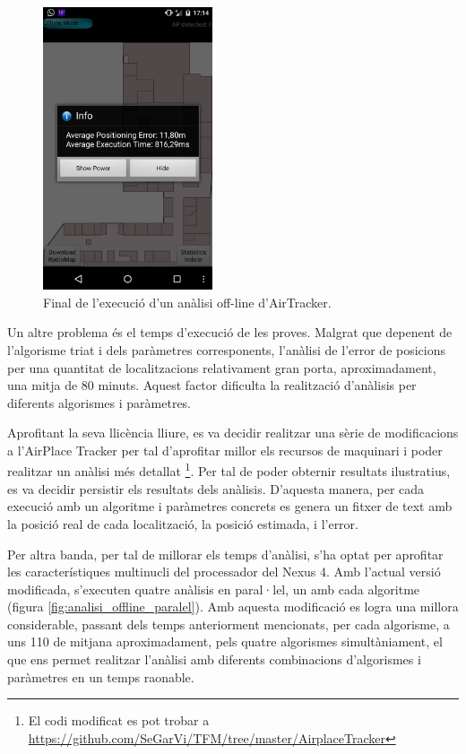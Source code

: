 \begin{figure}[ht]
\begin{center}
\includegraphics[width=5cm]{imatges/analisi_offline_defecte.png}
\caption{Final de l'execució d'un anàlisi off-line d'AirTracker.}
\label{fig:analisi_offline_defecte}
\end{center}
\end{figure}

Un altre problema és el temps d'execució de les proves. Malgrat que depenent de l'algorisme triat i dels paràmetres corresponents, l'anàlisi de l'error de posicions per una quantitat de localitzacions relativament gran porta, aproximadament, una mitja de 80 minuts. Aquest factor dificulta la realització d'anàlisis per diferents algorismes i paràmetres.

Aprofitant la seva llicència lliure, es va decidir realitzar una sèrie de modificacions a l'AirPlace Tracker per tal d'aprofitar millor els recursos de maquinari i poder realitzar un anàlisi més detallat \footnote{El codi modificat es pot trobar a \url{https://github.com/SeGarVi/TFM/tree/master/AirplaceTracker}}. Per tal de poder obternir resultats ilustratius, es va decidir persistir els resultats dels anàlisis. D'aquesta manera, per cada execució amb un algoritme i paràmetres concrets es genera un fitxer de text amb la posició real de cada localització, la posició estimada, i l'error.

Per altra banda, per tal de millorar els temps d'anàlisi, s'ha optat per aprofitar les característiques multinucli del processador del Nexus 4. Amb l'actual versió modificada, s'executen quatre anàlisis en paral·lel, un amb cada algoritme (figura \ref{fig:analisi_offline_paralel}). Amb aquesta modificació es logra una millora considerable, passant dels temps anteriorment mencionats, per cada algorisme, a uns 110 de mitjana aproximadament, pels quatre algorismes simultàniament, el que ens permet realitzar l'anàlisi amb diferents combinacions d'algorismes i paràmetres en un temps raonable.

